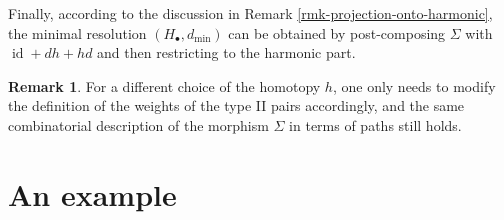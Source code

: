 \documentclass[11pt,reqno]{amsart}
\def\id {{\operatorname{id}}}
\theoremstyle{definition}
\newtheorem{remark}[theorem]{Remark}
\numberwithin{equation}{section}
\begin{document}
Finally, according to the discussion in Remark \ref{rmk-projection-onto-harmonic}, the minimal resolution $(H_{\bullet},d_{\min})$ can be obtained by post-composing $\Sigma$ with $\id + d h + h d$ and then restricting to the harmonic part.

\begin{remark}\label{rmk:choice-of-homotopy-2}
    For a different choice of the homotopy $h$, one only needs to modify the definition of the weights of the type II pairs accordingly, and the same combinatorial description of the morphism $\Sigma$ in terms of paths still holds.
\end{remark}




\section{An example}\label{sec:example}
\end{document}
